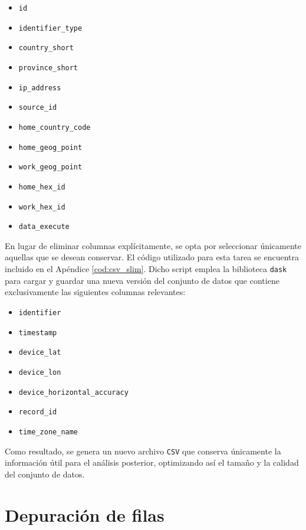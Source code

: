 \begin{itemize}
    \item \texttt{id}
    \item \texttt{identifier\_type}
    \item \texttt{country\_short}
    \item \texttt{province\_short}
    \item \texttt{ip\_address}
    \item \texttt{source\_id}
    \item \texttt{home\_country\_code}
    \item \texttt{home\_geog\_point}
    \item \texttt{work\_geog\_point}
    \item \texttt{home\_hex\_id}
    \item \texttt{work\_hex\_id}
    \item \texttt{data\_execute}
\end{itemize}

En lugar de eliminar columnas explícitamente, se opta por seleccionar únicamente aquellas que se desean conservar. El código utilizado para esta tarea se encuentra incluido en el Apéndice \ref{cod:csv_slim}. Dicho script emplea la biblioteca \texttt{dask} para cargar y guardar una nueva versión del conjunto de datos que contiene exclusivamente las siguientes columnas relevantes:

\begin{itemize}
    \item \texttt{identifier}
    \item \texttt{timestamp}
    \item \texttt{device\_lat}
    \item \texttt{device\_lon}
    \item \texttt{device\_horizontal\_accuracy}
    \item \texttt{record\_id}
    \item \texttt{time\_zone\_name}
\end{itemize}

Como resultado, se genera un nuevo archivo \texttt{CSV} que conserva únicamente la información útil para el análisis posterior, optimizando así el tamaño y la calidad del conjunto de datos.


\section{Depuración de filas}
\label{sec:depuracion_filas}

